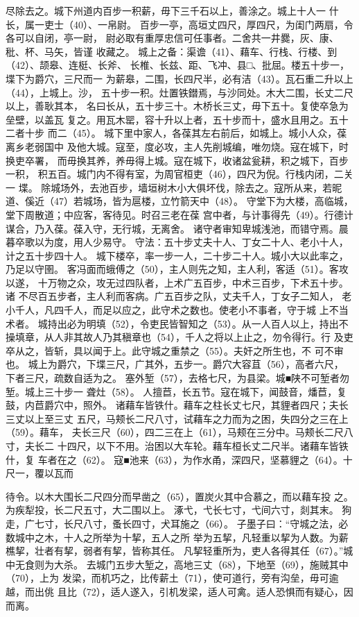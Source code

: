 \documentclass[12pt,UTF8]{ctexbook}
\begin{document}
尽除去之。城下州道内百步一积薪，毋下三千石以上，善涂之。城上十人一 
什长，属一吏士（40）、一帛尉。 
百步一亭，高垣丈四尺，厚四尺，为闺门两扇，令各可以自闭，亭一尉， 
尉必取有重厚忠信可任事者。二舍共一井爨，灰、康、秕、杯、马矢，皆谨 
收藏之。 
城上之备：渠谵（41）、藉车、行栈、行楼、到（42）、颉皋、连梃、长斧、 
长椎、长兹、距、飞冲、县□、批屈。楼五十步一，堞下为爵穴，三尺而一 
为薪皋，二围，长四尺半，必有洁（43）。瓦石重二升以上（44），上城上。沙， 
五十步一积。灶置铁鐟焉，与沙同处。木大二围，长丈二尺以上，善耿其本， 
名曰长从，五十步三十。木桥长三丈，毋下五十。复使卒急为垒壁，以盖瓦 
复之。用瓦木罂，容十升以上者，五十步而十，盛水且用之。五十二者十步 
而二（45）。 
城下里中家人，各葆其左右前后，如城上。城小人众，葆离乡老弱国中 
及他大城。寇至，度必攻，主人先削城编，唯勿烧。寇在城下，时换吏卒署， 
而毋换其养，养毋得上城。寇在城下，收诸盆瓮耕，积之城下，百步一积， 
积五百。城门内不得有室，为周官桓吏（46），四尺为倪。行栈内闭，二关一 
堞。 
除城场外，去池百步，墙垣树木小大俱坏伐，除去之。寇所从来，若昵 
道、傒近（47）若城场，皆为扈楼，立竹箭天中（48）。 
守堂下为大楼，高临城，堂下周散道；中应客，客待见。时召三老在葆 
宫中者，与计事得先（49）。行德计谋合，乃入葆。葆入守，无行城，无离舍。 
诸守者审知卑城浅池，而错守焉。晨暮卒歌以为度，用人少易守。 
守法：五十步丈夫十人、丁女二十人、老小十人，计之五十步四十人。 
城下楼卒，率一步一人，二十步二十人。城小大以此率之，乃足以守圉。 
客冯面而蛾傅之（50），主人则先之知，主人利，客适（51）。客攻以遂， 
十万物之众，攻无过四队者，上术广五百步，中术三百步，下术五十步。诸 
不尽百五步者，主人利而客病。广五百步之队，丈夫千人，丁女子二知人， 
老小千人，凡四千人，而足以应之，此守术之数也。使老小不事者，守于城 
上不当术者。 
城持出必为明填（52），令吏民皆智知之（53）。从一人百人以上，持出不 
操填章，从人非其故人乃其稹章也（54），千人之将以上止之，勿令得行。行 
及吏卒从之，皆斩，具以闻于上。此守城之重禁之（55）。夫奸之所生也，不 
可不审也。 
城上为爵穴，下堞三尺，广其外，五步一。爵穴大容苴（56），高者六尺， 
下者三尺，疏数自适为之。 
塞外堑（57），去格七尺，为县梁。城■陕不可堑者勿堑。城上三十步一 
聋灶（58）。 
人擅苣，长五节。寇在城下，闻鼓音，燔苣，复鼓，内苣爵穴中，照外。 
诸藉车皆铁什。藉车之柱长丈七尺，其貍者四尺；夫长三丈以上至三丈 
五尺，马颊长二尺八寸，试藉车之力而为之困，失四分之三在上（59）。藉车， 
夫长三尺（60），四二三在上（61），马颊在三分中。马颊长二尺八寸，夫长二 
十四尺，以下不用。治困以大车轮。藉车桓长丈二尺半。诸藉车皆铁什，复 
车者在之（62）。 
寇■池来（63），为作水甬，深四尺，坚慕貍之（64）。十尺一，覆以瓦而 

待令。以木大围长二尺四分而早凿之（65），置炭火其中合慕之，而以藉车投 
之。 
为疾犁投，长二尺五寸，大二围以上。 
涿弋，弋长七寸，弋间六寸，剡其末。 
狗走，广七寸，长尺八寸，蚤长四寸，犬耳施之（66）。 
子墨子曰：“守城之法，必数城中之木，十人之所举为十挈，五人之所 
举为五挈，凡轻重以挈为人数。为薪樵挈，壮者有挈，弱者有挈，皆称其任。 
凡挈轻重所为，吏人各得其任（67）。”城中无食则为大杀。 
去城门五步大堑之，高地三丈（68），下地至（69），施贼其中（70），上为 
发梁，而机巧之，比传薪土（71），使可道行，旁有沟垒，毋可逾越，而出佻 
且比（72），适人遂入，引机发梁，适人可禽。适人恐惧而有疑心，因而离。 
\end{document}
